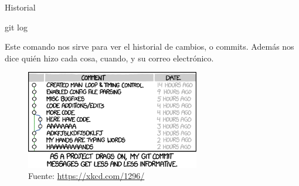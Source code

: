             


    

\begin{frame}{Historial}
 \begin{comando}
     git log
 \end{comando}
 \pause
 \begin{block}{}
     Este comando nos sirve para ver el historial de cambios, o commits. Además nos dice quién hizo cada cosa, cuando, y su correo electrónico.
 \end{block}
 \pause
    \begin{figure}[ht]
        \begin{center}
            \includegraphics[height=1.7in]{images/xkcd-git-commit.png}
        \end{center}
        \caption{Fuente: \url{https://xkcd.com/1296/}}
    \end{figure}
\end{frame}


